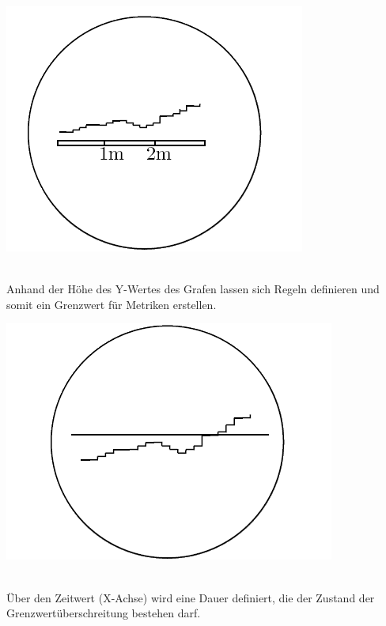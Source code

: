 \documentclass[a4paper,10pt]{scrartcl}
\begin{document}
\begin{minipage}{\linewidth}
  \includegraphics[scale=.3]{img/Datenaggregation/GrafZeitNew.png} 
\end{minipage} \\


Anhand der Höhe des Y-Wertes des Grafen lassen sich Regeln definieren und somit ein Grenzwert für Metriken erstellen.\\

\begin{minipage}{\linewidth}
  \includegraphics[scale=.3]{img/Datenaggregation/GrafYWertNew.png} 
\end{minipage}\\

Über den Zeitwert (X-Achse) wird eine Dauer definiert, die der Zustand der Grenzwertüberschreitung bestehen darf.\\
\end{document}
